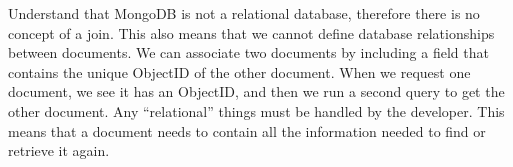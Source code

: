 Understand that MongoDB is not a relational database, therefore there is no concept of a join.
This also means that we cannot define database relationships between documents.
We can associate two documents by including a field that contains the unique ObjectID of the other document.
When we request one document, we see it has an ObjectID, and then we run a second query to get the other document.
Any ``relational'' things must be handled by the developer.
This means that a document needs to contain all the information needed to find or retrieve it again.
